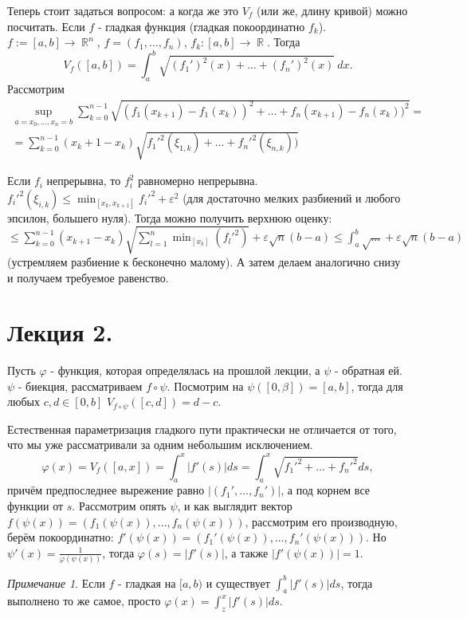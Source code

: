 \documentclass[a4paper,100pt]{article}
\theoremstyle{indented}
\theoremstyle{definition}
\theoremstyle{remark}
\newtheorem{remark}{Примечание}
\DeclareMathOperator{\RR}{\mathbb{R}}
\begin{document}
Теперь стоит задаться вопросом: а когда же это $V_f$ (или же, длину кривой) можно посчитать. Если $f$ - гладкая функция (гладкая покоординатно $f_k$). $f:=[a, b]\rightarrow \RR^n$, $f=(f_1, \ldots, f_n)$, $f_k:[a, b]\rightarrow \RR$. Тогда
\[
    V_f([a, b])=\int_a^b\sqrt{(f_1')^2(x)+\ldots+(f_n')^2(x)}\: dx.
\]
Рассмотрим
\begin{eqnarray*}
    \sup_{a=x_0, \ldots, x_n=b}\sum_{k=0}^{n-1}\sqrt{(f_1(x_{k+1})-f_1(x_k))^2+\ldots+f_n(x_{k+1})-f_n(x_k))^2} = \\ 
    = \sum_{k=0}^{n-1}(x_k+1-x_k)\sqrt{f_1'^2(\xi_{1, k})+\ldots+f_n'^2(\xi_{n, k}))}
\end{eqnarray*}

Если $f_i$ непрерывна, то $f_i^2$ равномерно непрерывна. $f_i'^2(\xi_{i, k})\leq \min_{[x_k, x_{k+1}]}f_i'^2+\varepsilon^2$ (для достаточно мелких разбиений и любого эпсилон, большего нуля). Тогда можно получить верхнюю оценку: $\leq \sum_{k=0}^{n-1}(x_{k+1}-x_k)\sqrt{\sum_{l=1}^n \min_{[x_k]}(f_l'^2)}+\varepsilon \sqrt{n}(b-a)\leq \int_a^b\sqrt{\dots}+\varepsilon \sqrt{n}(b-a)$ (устремляем разбиение к бесконечно малому). А затем делаем аналогично снизу и получаем требуемое равенство.

\section{Лекция 2.}

Пусть $\varphi$ - функция, которая определялась на прошлой лекции, а $\psi$ - обратная ей. $\psi$ - биекция, рассматриваем $f\circ \psi$. Посмотрим на $\psi([0, \beta])=[a,b]$, тогда для любых $c, d\in [0, b]$ $V_{f\circ\psi}([c, d])=d-c$.



Естественная параметризация гладкого пути практически не отличается от того, что мы уже рассматривали за одним небольшим исключением. 
\[
    \varphi(x)=V_f([a, x])=\int_a^x\vert f'(s)\vert ds=\int_a^x\sqrt{f_1'^2+\ldots+f_n'^2}ds,
\]
причём предпоследнее вырежение равно $\vert (f_1', \ldots, f_n')\vert$, а под корнем все функции от $s$. Рассмотрим опять $\psi$, и как выглядит вектор $f(\psi(x))=(f_1(\psi(x)), \ldots, f_n(\psi(x)))$, рассмотрим его производную, берём покоординатно: $f'(\psi(x))=(f_1'(\psi(x)), \ldots, f_n'(\psi(x)))$. Но $\psi'(x)=\frac{1}{\varphi(\psi(x))}$, тогда $\varphi(s)=\vert f'(s)\vert$, а также $\vert f'(\psi(x))\vert=1$.

\begin{remark}
    Если $f$ - гладкая на $[a, b)$ и существует $\int_a^b|f'(s)|ds$, тогда выполнено то же самое, просто $\varphi(x)=\int_z^x|f'(s)|ds$.
\end{remark}
\end{document}
